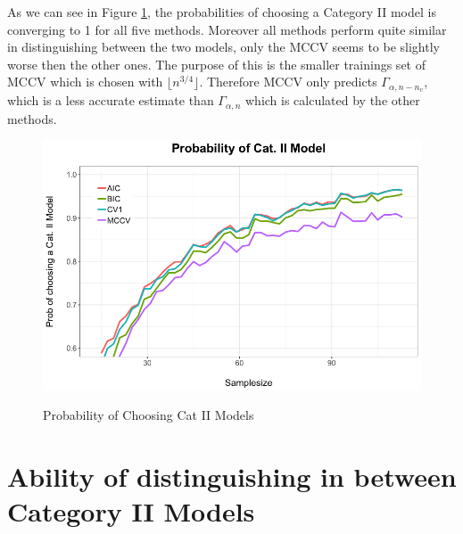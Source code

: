 \documentclass[Research_Module_ES.tex]{subfiles}
\begin{document}
As we can see in Figure \ref{Simulation1}, the probabilities of choosing a Category II model is converging to 1 for all five methods. Moreover all methods perform quite similar in distinguishing between the two models, only the MCCV seems to be slightly worse then the other ones. The purpose of this is the smaller trainings set of MCCV which is chosen with $\lfloor n^{3/4}\rfloor$. Therefore MCCV only predicts $\Gamma_{\alpha,n-n_v}$, which is a less accurate estimate than $\Gamma_{\alpha,n}$ which is calculated by the other methods. 
\begin{figure}[h]
	\label{Simulation1}
	\centering
	\includegraphics[width=1\textwidth]{Simulation1.png}\\
\caption{Probability of Choosing Cat II Models}
\end{figure}
\section{Ability of distinguishing in between Category II Models}
\end{document}
